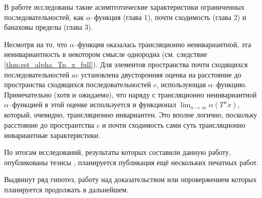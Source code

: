 В работе исследованы такие асимптотические характеристики ограниченных последовательностей,
как $\alpha$--функция (глава 1),  почти сходимость (глава 2) и банаховы пределы (глава 3).

Несмотря на то, что $\alpha$--функция оказалась трансляционно неинвариантной,
эта неинвариантность в некотором смысле однородна (см. следствие \ref{thm:est_alpha_Tn_x_full}).
Для элементов пространства почти сходящихся последовательностей $ac $
установлена двусторонняя оценка на расстояние до пространства сходящихся последовательностей $c$,
использующая $\alpha$--функцию.
Примечательно (хотя и ожидаемо), что наряду с трансляционно неинвариантной $\alpha$--функцией
в этой оценке используется и функционал $\lim_{n\to\infty}\alpha(T^n x)$,
который, очевидно, трансляционно инвариантен.
Это вполне логично, поскольку расстояние до пространтства $c$ и почти сходимость
сами суть трансляционно инвариантные характеристики.




По итогам исследований, результаты которых составили данную работу,
опубликованы тезисы \cite{our-vvmsh-2018,our-vzms-2018,our-ped-2018-inf-dim-ker,our-ped-2018-alpha-Tx},
планируется публикация ещё нескольких печатных работ.

Выдвинут ряд гипотез,
работу над доказательством или опровержением которых планируется продолжать в дальнейшем.
